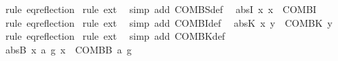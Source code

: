 \begin{isabellebody}
%
\isadelimproof
%
\endisadelimproof
%
\isatagproof
{}\isamarkupfalse%
\ {\isacharparenleft}{\kern0pt}rule\ eq{\isacharunderscore}{\kern0pt}reflection{\isacharparenright}{\kern0pt}\isanewline
{}\isamarkupfalse%
\ {\isacharparenleft}{\kern0pt}rule\ ext{\isacharparenright}{\kern0pt}\ \isanewline
{}\isamarkupfalse%
\ {\isacharparenleft}{\kern0pt}simp\ add{\isacharcolon}{\kern0pt}\ COMBS{\isacharunderscore}{\kern0pt}def{\isacharparenright}{\kern0pt}\ \isanewline
{}\isamarkupfalse%
%
\endisatagproof
{\isafoldproof}%
%
\isadelimproof
\isanewline
%
\endisadelimproof
\isanewline
{}\isamarkupfalse%
\ abs{\isacharunderscore}{\kern0pt}I{\isacharcolon}{\kern0pt}\ {\isachardoublequoteopen}{\isasymlambda}x{\isachardot}{\kern0pt}\ x\ {\isasymequiv}\ COMBI{\isachardoublequoteclose}\isanewline
%
\isadelimproof
%
\endisadelimproof
%
\isatagproof
{}\isamarkupfalse%
\ {\isacharparenleft}{\kern0pt}rule\ eq{\isacharunderscore}{\kern0pt}reflection{\isacharparenright}{\kern0pt}\isanewline
{}\isamarkupfalse%
\ {\isacharparenleft}{\kern0pt}rule\ ext{\isacharparenright}{\kern0pt}\ \isanewline
{}\isamarkupfalse%
\ {\isacharparenleft}{\kern0pt}simp\ add{\isacharcolon}{\kern0pt}\ COMBI{\isacharunderscore}{\kern0pt}def{\isacharparenright}{\kern0pt}\ \isanewline
{}\isamarkupfalse%
%
\endisatagproof
{\isafoldproof}%
%
\isadelimproof
\isanewline
%
\endisadelimproof
\isanewline
{}\isamarkupfalse%
\ abs{\isacharunderscore}{\kern0pt}K{\isacharcolon}{\kern0pt}\ {\isachardoublequoteopen}{\isasymlambda}x{\isachardot}{\kern0pt}\ y\ {\isasymequiv}\ COMBK\ y{\isachardoublequoteclose}\isanewline
%
\isadelimproof
%
\endisadelimproof
%
\isatagproof
{}\isamarkupfalse%
\ {\isacharparenleft}{\kern0pt}rule\ eq{\isacharunderscore}{\kern0pt}reflection{\isacharparenright}{\kern0pt}\isanewline
{}\isamarkupfalse%
\ {\isacharparenleft}{\kern0pt}rule\ ext{\isacharparenright}{\kern0pt}\ \isanewline
{}\isamarkupfalse%
\ {\isacharparenleft}{\kern0pt}simp\ add{\isacharcolon}{\kern0pt}\ COMBK{\isacharunderscore}{\kern0pt}def{\isacharparenright}{\kern0pt}\ \isanewline
{}\isamarkupfalse%
%
\endisatagproof
{\isafoldproof}%
%
\isadelimproof
\isanewline
%
\endisadelimproof
\isanewline
{}\isamarkupfalse%
\ abs{\isacharunderscore}{\kern0pt}B{\isacharcolon}{\kern0pt}\ {\isachardoublequoteopen}{\isasymlambda}x{\isachardot}{\kern0pt}\ a\ {\isacharparenleft}{\kern0pt}g\ x{\isacharparenright}{\kern0pt}\ {\isasymequiv}\ COMBB\ a\ g{\isachardoublequoteclose}\isanewline

\end{isabellebody}
